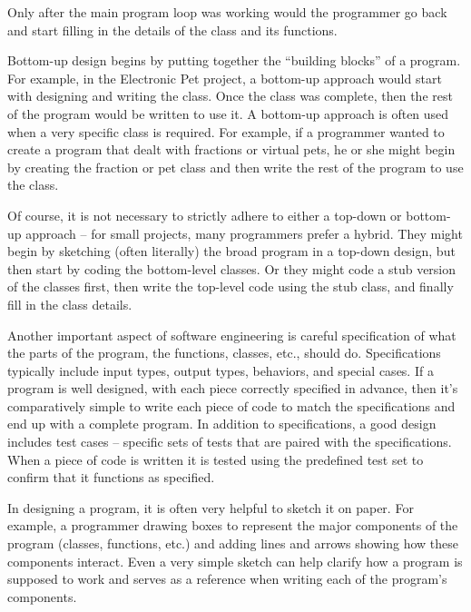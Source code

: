 Only after the main program loop was working would the programmer go back and start filling in the details of the  class and its functions.

Bottom-up design begins by putting together the ``building blocks'' of a program.  For example, in the Electronic Pet project, a bottom-up approach would start with designing and writing the  class.  Once the  class was complete, then the rest of the program would be written to use it.  A bottom-up approach is often used when a very specific class is required.  For example, if a programmer wanted to create a program that dealt with fractions or virtual pets, he or she might begin by creating the fraction or pet class and then write the rest of the program to use the class.  

Of course, it is not necessary to strictly adhere to either a top-down or bottom-up approach -- for small projects, many programmers prefer a hybrid.  They might begin by sketching (often literally) the broad program in a top-down design, but then start by coding the bottom-level classes. 
Or they might code a stub version of the classes first, then write the top-level code using the stub class, and finally fill in the class details.  

Another important aspect of software engineering is careful specification of what the parts of the program, the functions, classes, etc., should do.  Specifications typically include input types, output types, behaviors, and special cases.  If a program is well designed, with each piece correctly specified in advance, then it's comparatively simple to write each piece of code to match the specifications and end up with a complete program.  In addition to specifications, a good design includes test cases -- specific sets of tests that are paired with the specifications.  When a piece of code is written it is tested using the predefined test set to confirm that it functions as specified. 

In designing a program, it is often very helpful to sketch it on paper.  For example, a programmer drawing boxes to represent the major components of the program (classes, functions, etc.) and adding lines and arrows showing how these components interact.  Even a very simple sketch can help clarify how a program is supposed to work and serves as a reference when writing each of the program's components.


